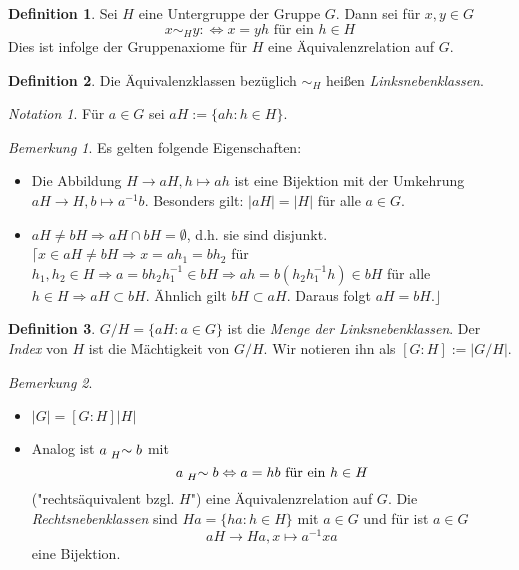 \documentclass[12pt]{scrartcl} %
\theoremstyle{definition}
\newtheorem*{defn}{Definition}
\theoremstyle{remark}
\newtheorem*{notation}{Notation}
\newtheorem*{nb}{Bemerkung}
\newcommand{\defi}{\emph}
\begin{document}
\begin{defn}
	Sei $H$ eine Untergruppe der Gruppe $G$.
	Dann sei für \(x, y \in G\) \[x \sim_{H} y :\Leftrightarrow \text{\(x = yh\) für ein \(h \in H\)}\]
	Dies ist infolge der Gruppenaxiome für \(H\) eine Äquivalenzrelation auf \(G\).
\end{defn}

\begin{defn}
	Die Äquivalenzklassen bezüglich $\sim_{H}$ heißen \emph{Linksnebenklassen}.
\end{defn}

\begin{notation}
	Für $a \in G$ sei $aH := \{ah : h \in H\}$.
\end{notation}

\begin{nb}
	Es gelten folgende Eigenschaften: 
	\begin{itemize}
	\item Die Abbildung $H \to aH, h \mapsto ah$ ist eine Bijektion mit der Umkehrung $aH \to H, b \mapsto a^{-1}b$.
		Besonders gilt: $\vert aH \vert = \vert H \vert$ für alle $a \in G$.
	\item $aH \neq bH \Rightarrow aH \cap bH = \emptyset$, d.h. sie sind disjunkt. \newline $\lceil x \in aH \neq bH \Rightarrow x = ah_{1} = bh_{2}$ für $h_{1},h_{2} \in H \Rightarrow a=bh_{2}h_{1}^{-1} \in bH \Rightarrow ah= b(h_{2}h_{1}^{-1}h) \in bH$ für alle $h \in H \Rightarrow aH \subset bH$. Ähnlich gilt $bH \subset aH$.
		Daraus folgt $aH=bH.\rfloor$ %
	\end{itemize}
\end{nb}

\begin{defn}
	$G/H = \lbrace aH : a \in G \rbrace$ ist die \defi{Menge der Linksnebenklassen}.
	Der \defi{Index} von $H$ ist die Mächtigkeit von $G/H$.
	Wir notieren ihn als \([G:H] := |G/H|\).
\end{defn}

\begin{nb}
	\begin{itemize}
 	\item $\vert G \vert = [G:H]\vert H\vert$
 	\item Analog ist $a \mathrel{\prescript{}{H}{\sim}} b$ mit \[a \mathrel{\prescript{}{H}{\sim}} b \Leftrightarrow \text{\(a=hb\) für ein \(h \in H\)}\] ("rechtsäquivalent bzgl. \(H\)") eine Äquivalenzrelation auf \(G\).
		Die \emph{Rechtsnebenklassen} sind $Ha=\lbrace ha : h \in H\rbrace$ mit $a \in G$ und für ist $a \in G$ \[aH \rightarrow Ha, x \mapsto a^{-1}xa\] eine Bijektion.
	\end{itemize}
\end{nb}
\end{document}
